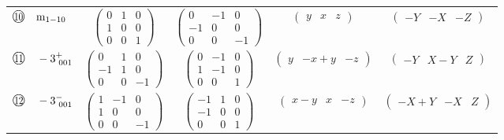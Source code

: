 \documentclass[fleqn,10pt,landscape]{jsarticle}
\begin{document}
\begin{center}
\begin{longtable}{lcccc}
$ {\ooalign{\hfil\resizebox{.8\width}{\height}{10}\hfil\crcr\raise.1ex\hbox{\large$\bigcirc$}}}\quad {\rm m}_{1-10} $ & $ \begin{pmatrix} 0 & 1 & 0 \\ 1 & 0 & 0 \\ 0 & 0 & 1 \end{pmatrix} $ & $ \begin{pmatrix} 0 & -1 & 0 \\ -1 & 0 & 0 \\ 0 & 0 & -1 \end{pmatrix} $ & $ \begin{pmatrix} y & x & z \end{pmatrix} $ & $ \begin{pmatrix} - Y & - X & - Z \end{pmatrix} $ \\
$ {\ooalign{\hfil\resizebox{.8\width}{\height}{11}\hfil\crcr\raise.1ex\hbox{\large$\bigcirc$}}}\quad -3^{+}_{\,\,001} $ & $ \begin{pmatrix} 0 & 1 & 0 \\ -1 & 1 & 0 \\ 0 & 0 & -1 \end{pmatrix} $ & $ \begin{pmatrix} 0 & -1 & 0 \\ 1 & -1 & 0 \\ 0 & 0 & 1 \end{pmatrix} $ & $ \begin{pmatrix} y & - x + y & - z \end{pmatrix} $ & $ \begin{pmatrix} - Y & X - Y & Z \end{pmatrix} $ \\
$ {\ooalign{\hfil\resizebox{.8\width}{\height}{12}\hfil\crcr\raise.1ex\hbox{\large$\bigcirc$}}}\quad -3^{-}_{\,\,001} $ & $ \begin{pmatrix} 1 & -1 & 0 \\ 1 & 0 & 0 \\ 0 & 0 & -1 \end{pmatrix} $ & $ \begin{pmatrix} -1 & 1 & 0 \\ -1 & 0 & 0 \\ 0 & 0 & 1 \end{pmatrix} $ & $ \begin{pmatrix} x - y & x & - z \end{pmatrix} $ & $ \begin{pmatrix} - X + Y & - X & Z \end{pmatrix} $ \\
\end{longtable}
\end{center}
\end{document}
